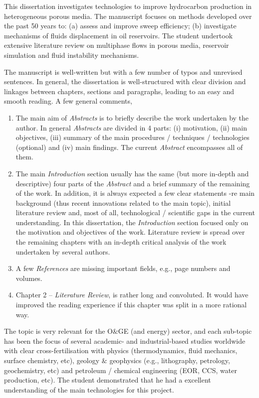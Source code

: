 \documentclass[14pt,twoside]{report}
\begin{document}
\medskip

This dissertation investigates technologies to improve hydrocarbon production in heterogeneous porous media. The manuscript focuses on methods developed over the past 50 years to: (a) assess and improve sweep efficiency; (b) investigate mechanisms of fluids displacement in oil reservoirs. The student undertook extensive literature review on multiphase flows in porous media, reservoir simulation and fluid instability mechanisms.

The manuscript is well-written but with a few number of typos and unrevised sentences. In general, the dissertation is well-structured with clear division and linkages between chapters, sections and paragraphs, leading to an easy and smooth reading. A few general comments,

\begin{enumerate}
\item The main aim of {\it Abstracts} is to briefly describe the work undertaken by the author. In general {\it Abstracts} are divided in 4 parts: (i) motivation, (ii) main objectives, (iii) summary of the main procedures / techniques / technologies (optional) and (iv) main findings. The current {\it Abstract} encompasses all of them.
%
\item The main {\it Introduction} section usually has the same (but more in-depth and descriptive) four parts of the {\it Abstract} and a brief summary of the remaining of the work. In addition, it is always expected a few clear statements -re main background (thus recent innovations related to the main topic), initial literature review and, most of all, technological / scientific gaps in the current understanding. In this dissertation, the {\it Introduction} section focused only on the motivation and objectives of the work. Literature review is spread over the remaining chapters with an in-depth critical analysis of the work undertaken by several authors. 
%
\item A few {\it References} are missing important fields, e.g., page numbers and volumes.
%
\item Chapter 2 -- {\it Literature Review}, is rather long and convoluted. It would have improved the reading experience if this chapter was split in a more rational way.
% 
\end{enumerate}

The topic is very relevant for the O$\&$GE (and energy) sector, and each sub-topic has been the focus of several academic- and industrial-based studies worldwide with clear cross-fertilisation with physics (thermodynamics, fluid mechanics, surface chemistry, etc), geology $\&$ geophysics (e.g., lithography, petrology, geochemistry, etc) and petroleum / chemical engineering (EOR, CCS, water production, etc). The student demonstrated that he had a excellent understanding of the main technologies for this project.
\end{document}
